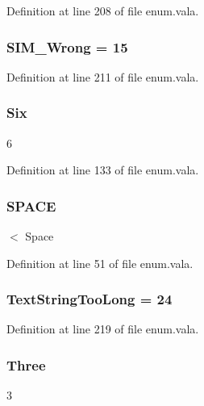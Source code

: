 Definition at line 208 of file enum.\-vala.

\hypertarget{enum_8vala_a4fa6993a5c6ee09f022aa77400312d3e}{
\subsubsection[{S\-I\-M\-\_\-\-Wrong}]{\setlength{\rightskip}{0pt plus 5cm}S\-I\-M\-\_\-\-Wrong = 15}}\label{enum_8vala_a4fa6993a5c6ee09f022aa77400312d3e}


Definition at line 211 of file enum.\-vala.

\hypertarget{enum_8vala_af327dfd1bc2e2ab345c37f6830271498}{
\subsubsection[{Six}]{\setlength{\rightskip}{0pt plus 5cm}Six}}\label{enum_8vala_af327dfd1bc2e2ab345c37f6830271498}
6 

Definition at line 133 of file enum.\-vala.

\hypertarget{enum_8vala_ae75d7b4459e07dec5aa9999730a43a38}{
\subsubsection[{S\-P\-A\-C\-E}]{\setlength{\rightskip}{0pt plus 5cm}S\-P\-A\-C\-E}}\label{enum_8vala_ae75d7b4459e07dec5aa9999730a43a38}
$<$ Space 

Definition at line 51 of file enum.\-vala.

\hypertarget{enum_8vala_a98dcfca4d65c0e143c59a9669ea21787}{
\subsubsection[{Text\-String\-Too\-Long}]{\setlength{\rightskip}{0pt plus 5cm}Text\-String\-Too\-Long = 24}}\label{enum_8vala_a98dcfca4d65c0e143c59a9669ea21787}


Definition at line 219 of file enum.\-vala.

\hypertarget{enum_8vala_a7595488bbd935760242afd8a3a2c0dcd}{
\subsubsection[{Three}]{\setlength{\rightskip}{0pt plus 5cm}Three}}\label{enum_8vala_a7595488bbd935760242afd8a3a2c0dcd}
3 

